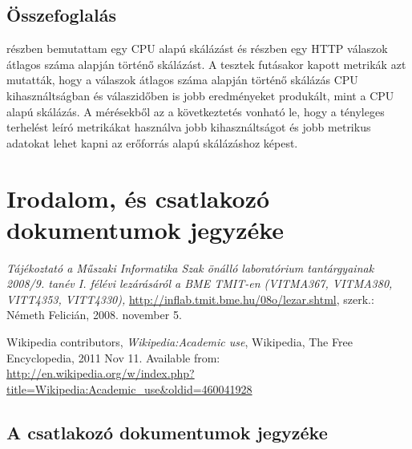 \documentclass[a4paper,oneside]{article}
\begin{document}
\subsection{Összefoglalás}
\label{sec:osszefoglalas}

 részben bemutattam egy CPU alapú skálázást és
 részben egy HTTP válaszok átlagos száma alapján
történő skálázást.  A tesztek futásakor kapott metrikák azt mutatták, hogy a
válaszok átlagos száma alapján történő skálázás CPU kihasználtságban és
válaszidőben is jobb eredményeket produkált, mint a CPU alapú skálázás.  A
mérésekből az a következtetés vonható le, hogy a tényleges terhelést leíró
metrikákat használva jobb kihasználtságot és jobb metrikus adatokat lehet
kapni az erőforrás alapú skálázáshoz képest.

\newpage
 
\section{Irodalom, és csatlakozó dokumentumok jegyzéke}
\label{sec:irod-es-csatl}

\begin{thebibliography}{9}
\label{sec:tanulm-irod-jegyz}

 \emph{Tájékoztató a Műszaki Informatika Szak önálló
    laboratórium tantárgyainak 2008/9. tanév I. félévi lezárásáról a
    BME TMIT-en (VITMA367, VITMA380, VITT4353, VITT4330),}
  \url{http://inflab.tmit.bme.hu/08o/lezar.shtml}, szerk.: Németh Felicián,
  2008. november 5.

 Wikipedia contributors, \emph{Wikipedia:Academic
    use}, Wikipedia, The Free Encyclopedia, 2011 Nov 11.  Available
  from: \\ \url{http://en.wikipedia.org/w/index.php?title=Wikipedia:Academic\_use\&oldid=460041928}

\end{thebibliography}

\subsection{A csatlakozó dokumentumok jegyzéke}
\label{sec:csat-irod}
\end{document}

